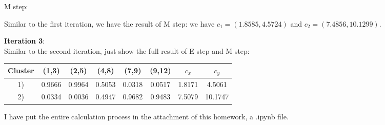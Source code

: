 M step:

Similar to the first iteration, we have the result of M step:
we have $c_1 = (1.8585, 4.5724)$ and $c_2 = (7.4856, 10.1299)$.

\textbf{Iteration 3}: \\
Similar to the second iteration, just show the full result of E step and M step:

\begin{table}[h]
    \centering
    \begin{tabular}{|c|c|c|c|c|c|c|c|}
    \hline
    Cluster & (1,3) & (2,5) & (4,8) & (7,9) & (9,12) & $c_x$ & $c_y$    \\
    \hline
    1)      & 0.9666   & 0.9964   & 0.5053   & 0.0318   & 0.0517 & 1.8171 & 4.5061  \\
    \hline
    2)      & 0.0334   & 0.0036   & 0.4947   & 0.9682   & 0.9483 & 7.5079 & 10.1747  \\
    \hline
    \end{tabular}
\end{table}

I have put the entire calculation process in the attachment of this homework, a .ipynb file.
